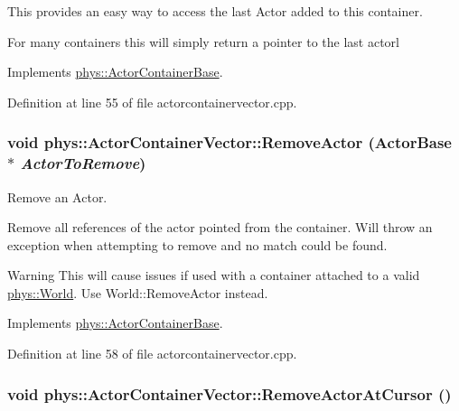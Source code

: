This provides an easy way to access the last Actor added to this container. 

For many containers this will simply return a pointer to the last actorl 

Implements \hyperlink{classphys_1_1ActorContainerBase_a6ccc6d058bcbbe0b9a638e28fb136477}{phys::ActorContainerBase}.



Definition at line 55 of file actorcontainervector.cpp.

\hypertarget{classphys_1_1ActorContainerVector_aeee5bd81601faed85e6a35f576c8d476}{
\subsubsection[{RemoveActor}]{\setlength{\rightskip}{0pt plus 5cm}void phys::ActorContainerVector::RemoveActor ({\bf ActorBase} $\ast$ {\em ActorToRemove})}}
\label{d3/d64/classphys_1_1ActorContainerVector_aeee5bd81601faed85e6a35f576c8d476}


Remove an Actor. 

Remove all references of the actor pointed from the container. Will throw an exception when attempting to remove and no match could be found. \begin{DoxyWarning}{Warning}
This will cause issues if used with a container attached to a valid \hyperlink{classphys_1_1World}{phys::World}. Use World::RemoveActor instead. 
\end{DoxyWarning}


Implements \hyperlink{classphys_1_1ActorContainerBase_a579e049a3190fcc1f951b3212c209616}{phys::ActorContainerBase}.



Definition at line 58 of file actorcontainervector.cpp.

\hypertarget{classphys_1_1ActorContainerVector_a430977daf010a25f53df6cf37954f8ca}{
\subsubsection[{RemoveActorAtCursor}]{\setlength{\rightskip}{0pt plus 5cm}void phys::ActorContainerVector::RemoveActorAtCursor ()}}
\label{d3/d64/classphys_1_1ActorContainerVector_a430977daf010a25f53df6cf37954f8ca}


